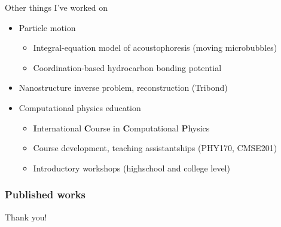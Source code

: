 \documentclass[aspectratio=169, usenames, dvipsnames]{beamer}
\begin{document}
\begin{frame}{Other things I've worked on}
  \begin{itemize}
    \item[] Particle motion
      \begin{itemize}
        \item Integral-equation model of acoustophoresis (moving microbubbles)
        \item Coordination-based hydrocarbon bonding potential
      \end{itemize}
    \item[] Nanostructure inverse problem, reconstruction (Tribond)
    \item[] Computational physics education
      \begin{itemize}
        \item \textbf{I}nternational \textbf{C}ourse in \textbf{C}omputational \textbf{P}hysics
        \item Course development, teaching assistantships (PHY170, CMSE201)
        \item Introductory workshops (highschool and college level)
      \end{itemize}
  \end{itemize}
\end{frame}

\begin{frame}[t, allowframebreaks]
  \frametitle{Published works}
  \nocite{*}
  
  
\end{frame}

\begin{frame}[standout]
  Thank you! 
\end{frame}

\appendix
\end{document}
